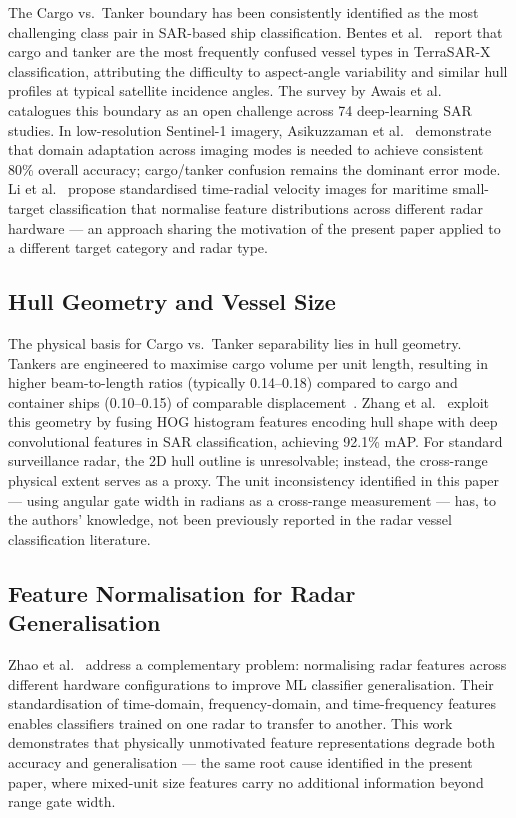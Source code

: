 \documentclass[journal]{IEEEtran}
\begin{document}
The Cargo vs.\ Tanker boundary has been consistently identified as the most challenging class pair in SAR-based ship classification. Bentes et al.~\cite{bentes2017sar} report that cargo and tanker are the most frequently confused vessel types in TerraSAR-X classification, attributing the difficulty to aspect-angle variability and similar hull profiles at typical satellite incidence angles. The survey by Awais et al.~\cite{awais2025survey} catalogues this boundary as an open challenge across 74 deep-learning SAR studies. In low-resolution Sentinel-1 imagery, Asikuzzaman et al.~\cite{asikuzzaman2025sar} demonstrate that domain adaptation across imaging modes is needed to achieve consistent 80\% overall accuracy; cargo/tanker confusion remains the dominant error mode. Li et al.~\cite{li2025tfd} propose standardised time-radial velocity images for maritime small-target classification that normalise feature distributions across different radar hardware --- an approach sharing the motivation of the present paper applied to a different target category and radar type.

\subsection{Hull Geometry and Vessel Size}

The physical basis for Cargo vs.\ Tanker separability lies in hull geometry. Tankers are engineered to maximise cargo volume per unit length, resulting in higher beam-to-length ratios (typically 0.14--0.18) compared to cargo and container ships (0.10--0.15) of comparable displacement~\cite{stopford2009maritime}. Zhang et al.~\cite{zhang2021hog} exploit this geometry by fusing HOG histogram features encoding hull shape with deep convolutional features in SAR classification, achieving 92.1\% mAP. For standard surveillance radar, the 2D hull outline is unresolvable; instead, the cross-range physical extent serves as a proxy. The unit inconsistency identified in this paper --- using angular gate width in radians as a cross-range measurement --- has, to the authors' knowledge, not been previously reported in the radar vessel classification literature.

\subsection{Feature Normalisation for Radar Generalisation}

Zhao et al.~\cite{zhao2025norm} address a complementary problem: normalising radar features across different hardware configurations to improve ML classifier generalisation. Their standardisation of time-domain, frequency-domain, and time-frequency features enables classifiers trained on one radar to transfer to another. This work demonstrates that physically unmotivated feature representations degrade both accuracy and generalisation --- the same root cause identified in the present paper, where mixed-unit size features carry no additional information beyond range gate width.
\end{document}
